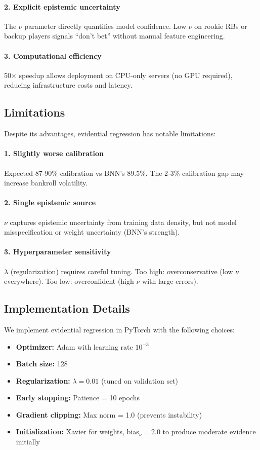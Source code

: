 \paragraph{2. Explicit epistemic uncertainty} The $\nu$ parameter directly quantifies model confidence. Low $\nu$ on rookie RBs or backup players signals ``don't bet'' without manual feature engineering.

\paragraph{3. Computational efficiency} 50× speedup allows deployment on CPU-only servers (no GPU required), reducing infrastructure costs and latency.

\subsection{Limitations}

Despite its advantages, evidential regression has notable limitations:

\paragraph{1. Slightly worse calibration} Expected 87-90\% calibration vs BNN's 89.5\%. The 2-3\% calibration gap may increase bankroll volatility.

\paragraph{2. Single epistemic source} $\nu$ captures epistemic uncertainty from training data density, but not model misspecification or weight uncertainty (BNN's strength).

\paragraph{3. Hyperparameter sensitivity} $\lambda$ (regularization) requires careful tuning. Too high: overconservative (low $\nu$ everywhere). Too low: overconfident (high $\nu$ with large errors).

\subsection{Implementation Details}

We implement evidential regression in PyTorch with the following choices:

\begin{itemize}[nosep]
    \item \textbf{Optimizer:} Adam with learning rate $10^{-3}$
    \item \textbf{Batch size:} 128
    \item \textbf{Regularization:} $\lambda = 0.01$ (tuned on validation set)
    \item \textbf{Early stopping:} Patience = 10 epochs
    \item \textbf{Gradient clipping:} Max norm = 1.0 (prevents instability)
    \item \textbf{Initialization:} Xavier for weights, bias$_\nu = 2.0$ to produce moderate evidence initially
\end{itemize}

